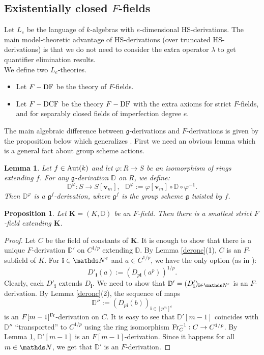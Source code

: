 \documentclass[10pt]{amsart}
\newtheorem{prop}[theorem]{Proposition}
\newtheorem{lemma}[theorem]{Lemma}
\theoremstyle{definition}
\begin{document}
\subsection{Existentially closed $F$-fields}\label{sececf}
Let $L_e$ be the language of $k$-algebras with $e$-dimensional HS-derivations. The main model-theoretic advantage of HS-derivations (over truncated HS-derivations) is that we do not need to consider the extra operator $\lambda$ to get quantifier elimination results.
\\
We define two $L_e$-theories.
\begin{itemize}
\item Let $F-\operatorname{DF}$ be the theory of $F$-fields.

\item Let $F-\operatorname{DCF}$ be the theory $F-\operatorname{DF}$ with the extra axioms for strict $F$-fields, and for separably closed fields of imperfection degree $e$.
\end{itemize}
\noindent
The main algebraic difference between $\mathfrak{g}$-derivations and $F$-derivations is given by the proposition below which generalizes \cite[Lemma 2.4]{Zieg2}. First we need an obvious lemma which is a general fact about group scheme actions.
\begin{lemma}\label{transport}
Let $f\in \operatorname{Aut}(k)$ and let $\varphi:R\to S$ be an isomorphism of rings extending $f$. For any $\mathfrak{g}$-derivation $\mathbb{D}$ on $R$, we define:
$$\mathbb{D}^{\varphi}:S\to S[\mathbf{v}_m],\ \ \ \mathbb{D}^{\varphi}:=\varphi[\mathbf{v}_m]\circ \mathbb{D}\circ \varphi^{-1}.$$
Then $\mathbb{D}^{\varphi}$ is a $\mathfrak{g}^{f}$-derivation, where $\mathfrak{g}^{f}$ is the group scheme $\mathfrak{g}$ twisted by $f$.
\end{lemma}
\begin{prop}\label{strictext}
 Let $\mathbf{K}=(K,\mathbb{D})$ be an $F$-field. Then there is a smallest strict $F$-field extending $\mathbf{K}$.
\end{prop}
\begin{proof}
Let $C$ be the field of constants of $\mathbf{K}$. It is enough to show that there is a unique $F$-derivation $\mathbb{D}'$ on $C^{1/p}$ extending $\mathbb{D}$. By Lemma \ref{deronc}(1), $C$ is an $F$-subfield of $K$. For $\mathbf{i}\in \Nn^e$ and $a\in C^{1/p}$, we have the only option (as in \cite[Lemma 2.4]{Zieg2}):
$$D'_{\mathbf{i}}(a):=(D_{p\mathbf{i}}(a^p))^{1/p}.$$
Clearly, each $D'_{\mathbf{i}}$ extends $D_{\mathbf{i}}$. We need to show that $\mathbb{D}'=(D'_{\mathbf{i}})_{\mathbf{i}\in \Nn^e}$ is an $F$-derivation. By Lemma \ref{deronc}(2), the sequence of maps
$$\mathbb{D}'':=(D_{p\mathbf{i}}(b))_{\mathbf{i}\in [p^m]^e}$$
is an $F[m-1]^{\operatorname{Fr}}$-derivation on $C$. It is easy to see that $\mathbb{D}'[m-1]$ coincides with $\mathbb{D}''$ ``transported'' to $C^{1/p}$ using the ring isomorphism $\operatorname{Fr}^{-1}_C:C\to C^{1/p}$. By Lemma \ref{transport}, $\mathbb{D}'[m-1]$ is an $F[m-1]$-derivation. Since it happens for all $m\in \Nn$, we get that $\mathbb{D}'$ is an $F$-derivation.
\end{proof}
\end{document}
